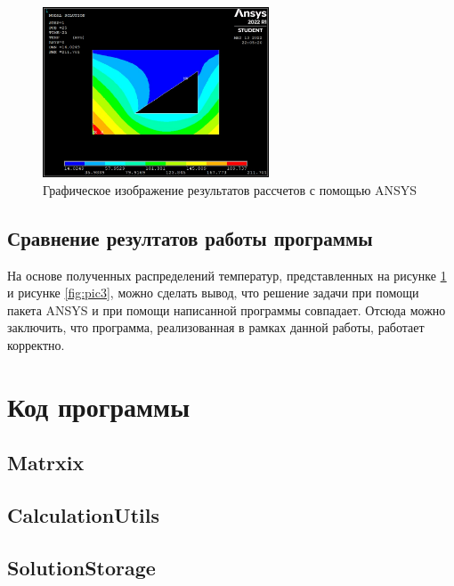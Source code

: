 \documentclass[12pt, a4paper]{article}
\begin{document}
    \begin{figure}[h]
    	\centering    %
    	\includegraphics[width=0.6\textwidth]{static/AnsysResult.jpg}
    	\caption{Графическое изображение результатов рассчетов с помощью ANSYS} %
    	\label{fig:pic4} %
    \end{figure}

    \subsection{Сравнение резултатов работы программы}
    На основе полученных распределений температур, представленных на рисунке \ref{fig:pic4} и рисунке \ref{fig:pic3}, можно сделать вывод, что решение задачи при помощи пакета ANSYS и при помощи написанной программы совпадает. Отсюда можно заключить, что программа, реализованная в рамках данной работы, работает корректно.
	
	\section{Код программы}
	
	\subsection{Matrxix}
	
	
	\subsection{CalculationUtils}
	
	
	\subsection{SolutionStorage}
	
	
\end{document}
